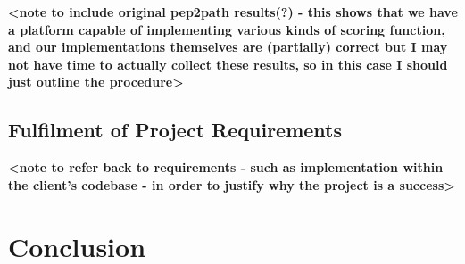 \documentclass{l4proj}
\begin{document}
\textbf{<note to include original pep2path results(?) - this shows that we have a platform capable of implementing various kinds of scoring function, and our implementations themselves are (partially) correct but I may not have time to actually collect these results, so in this case I should just outline the procedure>}

\section{Fulfilment of Project Requirements}

\textbf{<note to refer back to requirements - such as implementation within the client's codebase - in order to justify why the project is a success>}

\chapter{Conclusion}    

%
% 
\end{document}
